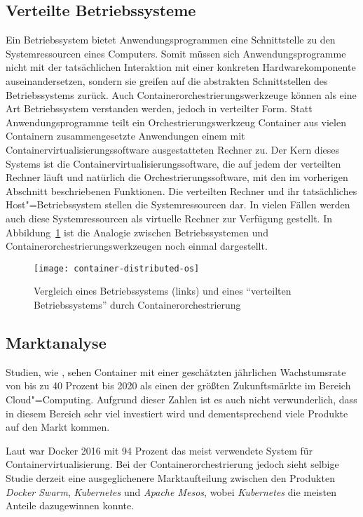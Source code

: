 \subsection{Verteilte Betriebssysteme}

Ein Betriebssystem bietet Anwendungsprogrammen eine Schnittstelle zu den Systemressourcen eines Computers. Somit müssen sich Anwendungsprogramme nicht mit der tatsächlichen Interaktion mit einer konkreten Hardwarekomponente auseinandersetzen, sondern sie greifen auf die abstrakten Schnittstellen des Betriebssystems zurück. Auch Containerorchestrierungswerkzeuge können als eine Art Betriebssystem verstanden werden, jedoch in verteilter Form. Statt Anwendungsprogramme teilt ein Orchestrierungswerkzeug Container \bzw aus vielen Containern zusammengesetzte Anwendungen einem mit Containervirtualisierungssoftware ausgestatteten Rechner zu. Der Kern dieses Systems ist die Containervirtualisierungssoftware, die auf jedem der verteilten Rechner läuft und natürlich die Orchestrierungssoftware, mit den im vorherigen Abschnitt beschriebenen Funktionen. Die verteilten Rechner und ihr tatsächliches Host"=Betriebssystem stellen die Systemressourcen dar. In vielen Fällen werden auch diese Systemressourcen als virtuelle Rechner zur Verfügung gestellt. In Abbildung~\ref{fig:container-distributed-os} ist die Analogie zwischen Betriebssystemen und Containerorchestrierungswerkzeugen noch einmal dargestellt.

\begin{figure}[!hbt]%
\centering
\texttt{[image: container-distributed-os]}%
\caption{Vergleich eines Betriebssystems (links) und eines "`verteilten Betriebssystems"' durch Containerorchestrierung \cite{ContainerOrcaWars}}%
\label{fig:container-distributed-os}%
\end{figure}

\subsection{Marktanalyse}

Studien, wie \cite{ContainerMarketGrowth}, sehen Container mit einer geschätzten jährlichen Wachstumsrate von bis zu 40 Prozent bis 2020 als einen der größten Zukunftsmärkte im Bereich Cloud"=Computing. Aufgrund dieser Zahlen ist es auch nicht verwunderlich, dass in diesem Bereich sehr viel investiert wird und dementsprechend viele Produkte auf den Markt kommen. 

Laut \cite{ContainerMarketReport} war Docker 2016 mit 94 Prozent das meist verwendete System für Containervirtualisierung. Bei der Containerorchestrierung jedoch sieht selbige Studie derzeit eine ausgeglichenere Marktaufteilung zwischen den Produkten \textit{Docker Swarm}, \textit{Kubernetes} und \textit{Apache Mesos}, wobei \textit{Kubernetes} die meisten Anteile dazugewinnen konnte.

